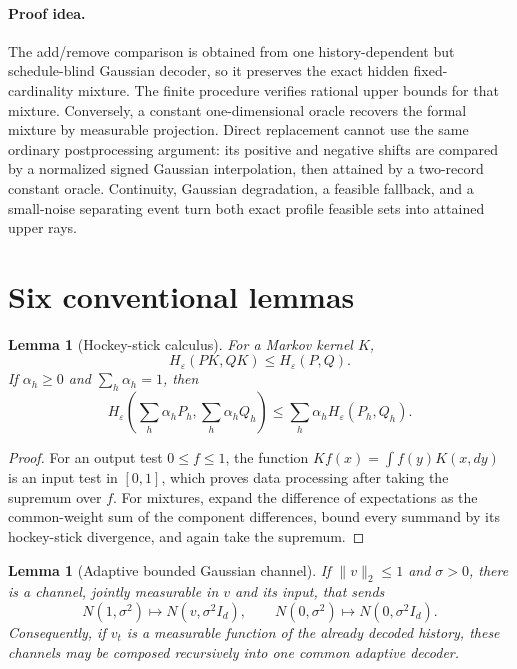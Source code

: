 \documentclass[11pt]{article}
\newtheorem{lemma}[theorem]{Lemma}
\theoremstyle{remark}
\begin{document}
\paragraph{Proof idea.}
The add/remove comparison is obtained from one history-dependent but
schedule-blind Gaussian decoder, so it preserves the exact hidden
fixed-cardinality mixture.  The finite procedure verifies rational upper
bounds for that mixture.  Conversely, a constant one-dimensional oracle
recovers the formal mixture by measurable projection.  Direct replacement
cannot use the same ordinary postprocessing argument: its positive and
negative shifts are compared by a normalized signed Gaussian interpolation,
then attained by a two-record constant oracle.  Continuity, Gaussian
degradation, a feasible fallback, and a small-noise separating event turn both
exact profile feasible sets into attained upper rays.

\section{Six conventional lemmas}

\begin{lemma}[Hockey-stick calculus]\label{lem:hs}
For a Markov kernel $K$,
\[
 H_\varepsilon(PK,QK)\leq H_\varepsilon(P,Q).
\]
If $\alpha_h\geq0$ and $\sum_h\alpha_h=1$, then
\[
 H_\varepsilon\!\left(\sum_h\alpha_hP_h,\sum_h\alpha_hQ_h\right)
 \leq\sum_h\alpha_hH_\varepsilon(P_h,Q_h).
\]
\end{lemma}

\begin{proof}
For an output test $0\leq f\leq1$, the function
$Kf(x)=\int f(y)K(x,dy)$ is an input test in $[0,1]$, which proves data
processing after taking the supremum over $f$.  For mixtures, expand the
difference of expectations as the common-weight sum of the component
differences, bound every summand by its hockey-stick divergence, and again
take the supremum.
\end{proof}

\begin{lemma}[Adaptive bounded Gaussian channel]\label{lem:channel}
If $\|v\|_2\leq1$ and $\sigma>0$, there is a channel, jointly measurable in
$v$ and its input, that sends
\[
 N(1,\sigma^2)\mapsto N(v,\sigma^2I_d),
 \qquad
 N(0,\sigma^2)\mapsto N(0,\sigma^2I_d).
\]
Consequently, if $v_t$ is a measurable function of the already decoded
history, these channels may be composed recursively into one common adaptive
decoder.
\end{lemma}
\end{document}
